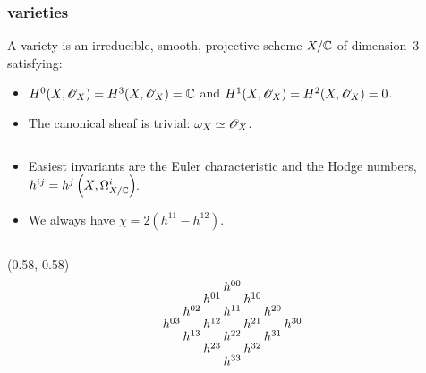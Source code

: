 \begin{frame}
\frametitle{\CY varieties}

\begin{definition}%
    A \alert{\CY variety} is an irreducible, smooth, projective scheme $X/\mathbb{C}$ of dimension~$3$ satisfying:
    \begin{itemize}
      \item
      $H^0(X, \mathscr{O}_X) = H^3(X, \mathscr{O}_X) = \mathbb{C}$ and $H^1(X, \mathscr{O}_X) = H^2(X, \mathscr{O}_X) = 0$.

      \item
      The canonical sheaf is trivial: $\omega_X \simeq \mathscr{O}_X$. 
    \end{itemize}
\end{definition}

\unskip
\begin{columns}[onlytextwidth]
    \begin{column}{0.6\textwidth}
        \begin{itemize}
          \item
          Easiest invariants are the {Euler characteristic} and the {Hodge numbers}, $h^{ij} = h^j\left(X, \Omega_{X/\mathbb{C}}^i\right)\mkern-2mu$.

            \item
            We always have $\chi = 2(h^{11} - h^{12})$. 
        \end{itemize}
    \end{column}
\end{columns}

{
    \begin{textblock}{0.4}(0.58, 0.58)
        \[
            \arraycolsep = 1pt
            \def\arraystretch{0.5}
            \begin{array}[c]{ccccccc}
                &&& h^{00}                               \\  
                &&  h^{01} && h^{10}                     \\
                &   h^{02} && h^{11} && h^{20}           \\
                    h^{03} && h^{12} && h^{21} && h^{30} \\
                &   h^{13} && h^{22} && h^{31}           \\
                &&  h^{23} && h^{32}                     \\
                &&& h^{33} 
            \end{array}
        \]  
    \end{textblock}
}


\end{frame}
